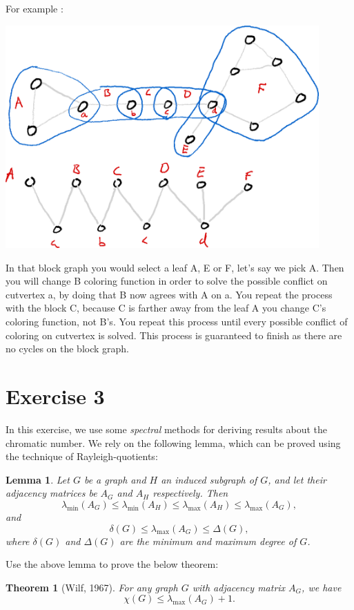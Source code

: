\documentclass{article}
\newtheorem{lemma}{Lemma}
\newtheorem{theorem}{Theorem}
\begin{document}
For example :

\includegraphics[width=0.9\textwidth]{graph_with_blockgraph.png}

In that block graph you would select a leaf A, E or F, let's say we pick A. Then you will change B coloring function in order to solve the possible conflict on cutvertex a, by doing that B now agrees with A on a. You repeat the process with the block C, because C is farther away from the leaf A you change C's coloring function, not B's. You repeat this process until every possible conflict of coloring on cutvertex is solved. This process is guaranteed to finish as there are no cycles on the block graph. 



\section*{Exercise 3}
 In this exercise, we use some \emph{spectral} methods for deriving results about the chromatic number. We rely on the following lemma, which can be proved using the technique of Rayleigh-quotients:

\begin{lemma}
  Let $G$ be a graph and $H$ an induced subgraph of $G$, and let their adjacency matrices be $A_G$ and $A_H$ respectively. Then
  $$\lambda_{\min}\left(A_G\right) \leq \lambda_{\min}\left(A_H\right) \leq \lambda_{\max}\left(A_H\right) \leq \lambda_{\max}\left(A_G\right),$$
  and
  $$\delta(G) \leq \lambda_{\max}\left(A_G\right) \leq \Delta(G),$$
  where $\delta(G)$ and $\Delta(G)$ are the minimum and maximum degree of $G$.
\end{lemma}

Use the above lemma to prove the below theorem:
\begin{theorem}[Wilf, 1967]
  For any graph $G$ with adjacency matrix $A_G$, we have
  $$\chi(G) \leq \lambda_{\max}\left(A_G\right) + 1.$$
\end{theorem}
\end{document}
